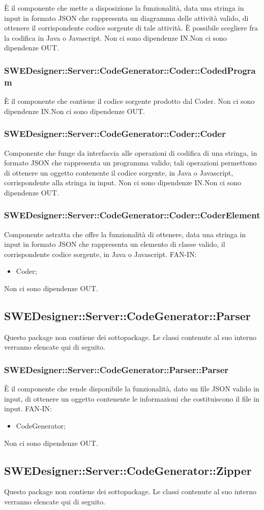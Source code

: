 \documentclass[../PianoDiQualifica.tex]{subfiles}
\begin{document}
		È il componente che mette a disposizione la funzionalità, data una stringa in input in formato JSON che rappresenta un diagramma delle attività valido, di ottenere il corrispondente codice sorgente di tale attività. È possibile scegliere fra la codifica in Java o Javascript.
		Non ci sono dipendenze IN.Non ci sono dipendenze OUT.\subsubsection{SWEDesigner::Server::CodeGenerator::Coder::CodedProgram}
		È il componente che contiene il codice sorgente prodotto dal Coder.
		Non ci sono dipendenze IN.Non ci sono dipendenze OUT.\subsubsection{SWEDesigner::Server::CodeGenerator::Coder::Coder}
		Componente che funge da interfaccia alle operazioni di codifica di una stringa, in formato JSON che rappresenta un programma valido; tali operazioni permettono di ottenere un oggetto contenente il codice sorgente, in Java o Javascript, corrispondente alla stringa in input.
		Non ci sono dipendenze IN.Non ci sono dipendenze OUT.\subsubsection{SWEDesigner::Server::CodeGenerator::Coder::CoderElement}
		Componente astratta che offre la funzionalità di ottenere, data una stringa in input in formato JSON che rappresenta un elemento di classe valido, il corrispondente codice sorgente, in Java o Javascript.
		FAN-IN:
		\begin{itemize}
			\item Coder;
		\end{itemize}
		Non ci sono dipendenze OUT.\subsection{SWEDesigner::Server::CodeGenerator::Parser}
		Questo package non contiene dei sottopackage.
		Le classi contenute al suo interno verranno elencate qui di seguito.
		\subsubsection{SWEDesigner::Server::CodeGenerator::Parser::Parser}
		È il componente che rende disponibile la funzionalità, dato un file JSON valido in input, di ottenere un oggetto contenente le informazioni che costituiscono il file in input.
		FAN-IN:
		\begin{itemize}
			\item CodeGenerator;
		\end{itemize}
		Non ci sono dipendenze OUT.\subsection{SWEDesigner::Server::CodeGenerator::Zipper}
		Questo package non contiene dei sottopackage.
		Le classi contenute al suo interno verranno elencate qui di seguito.
\end{document}
